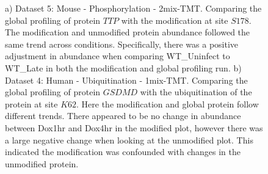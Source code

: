 \documentclass[mcp]{article}
\numberwithin{table}{section}
\begin{document}
\begin{figure}[h!]
\begin{subfigure}{\textwidth}
	\caption{}
	\label{fig:data5_profile_plot}
	 \end{subfigure}
\caption{a) Dataset 5: Mouse - Phosphorylation - 2mix-TMT. Comparing the global profiling of protein $TTP$ with the modification at site $S178$. The modification and unmodified protein abundance followed the same trend across conditions. Specifically, there was a positive adjustment in abundance when comparing WT\_Uninfect to WT\_Late in both the modification and global profiling run. b) Dataset 4: Human - Ubiquitination - 1mix-TMT. Comparing the global profiling of protein $GSDMD$ with the ubiquitination of the protein at site $K62$. Here the modification and global protein follow different trends. There appeared to be no change in abundance between Dox1hr and Dox4hr in the modified plot, however there was a large negative change when looking at the unmodified plot. This indicated the modification was confounded with changes in the unmodified protein.}
\label{fig:profile_plots}
\end{figure}
\end{document}

